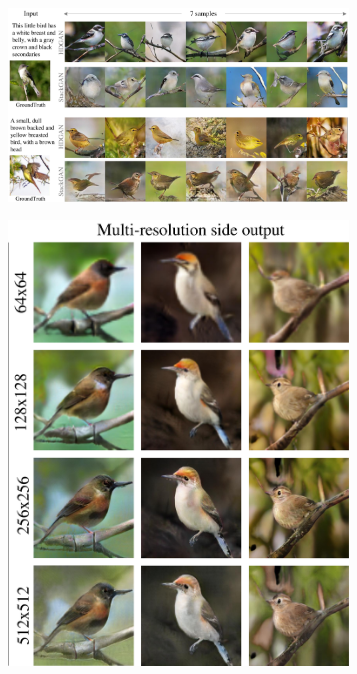 \documentclass[10pt,twocolumn,letterpaper]{article}
\begin{document}
\begin{figure}[t]
	\centering
	\begin{subfigure}[t]{0.69\textwidth}
		\includegraphics[width=0.99\textwidth]{figure/multisample_cub.pdf}
	\end{subfigure} 
	\begin{subfigure}[t]{0.3\textwidth}
		\includegraphics[width=0.99\textwidth]{figure/cub_multires.pdf}

\end{subfigure}
\end{figure}
\end{document}
